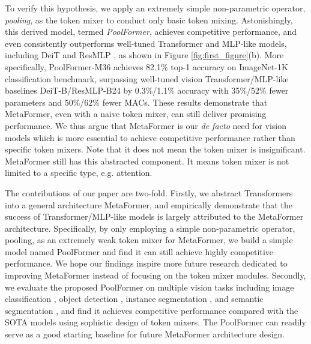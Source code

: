 To verify this hypothesis, we apply an extremely simple non-parametric operator, \emph{pooling}, as the token mixer to conduct only basic token mixing. Astonishingly, this derived model, termed \emph{PoolFormer}, achieves competitive performance, and even consistently outperforms well-tuned Transformer and MLP-like models, including DeiT \cite{deit} and ResMLP \cite{resmlp}, as shown in Figure \ref{fig:first_figure}(b). More specifically, PoolFormer-M36 achieves 82.1\% top-1 accuracy on ImageNet-1K classification benchmark, surpassing well-tuned vision Transformer/MLP-like baselines DeiT-B/ResMLP-B24 by 0.3\%/1.1\% accuracy with 35\%/52\% fewer parameters and 50\%/62\% fewer MACs. These results demonstrate that MetaFormer, even with a naive token mixer, can still deliver promising performance. We thus argue that MetaFormer is our \emph{de facto} need for vision models which is more essential to achieve competitive performance rather than specific token mixers. Note that it does not mean the token mixer is insignificant. MetaFormer still has this abstracted component. It means token mixer is not limited to a specific type, e.g. attention.


The contributions of our paper are two-fold. Firstly, we abstract Transformers into a general architecture MetaFormer, and empirically demonstrate that the success of Transformer/MLP-like models is largely attributed to the  MetaFormer architecture. Specifically, by only employing a simple non-parametric operator, pooling, as an extremely weak token mixer for MetaFormer, we build a simple model named PoolFormer and find it can still achieve highly competitive performance. We hope our findings inspire more future research dedicated to improving MetaFormer instead of focusing on the token mixer modules. Secondly, we evaluate the proposed PoolFormer on multiple vision tasks including image classification \cite{imagenet}, object detection \cite{coco}, instance segmentation \cite{coco}, and semantic segmentation \cite{ade20k}, and find it achieves competitive performance compared with the SOTA models using sophistic design of token mixers. The PoolFormer can readily serve as a good starting baseline for future MetaFormer architecture design.







